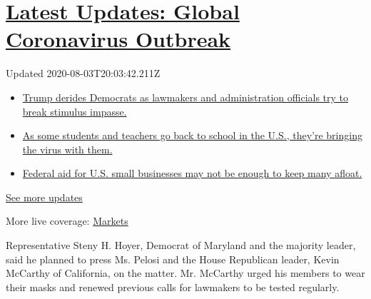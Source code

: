 \hypertarget{latest-updates-global-coronavirus-outbreak}{%
\section{\texorpdfstring{\href{https://www.nytimes.com/2020/08/03/world/coronavirus-covid-19.html?action=click\&pgtype=Article\&state=default\&region=MAIN_CONTENT_1\&context=storylines_live_updates}{Latest
Updates: Global Coronavirus
Outbreak}}{Latest Updates: Global Coronavirus Outbreak}}\label{latest-updates-global-coronavirus-outbreak}}

Updated 2020-08-03T20:03:42.211Z

\begin{itemize}
\tightlist
\item
  \href{https://www.nytimes.com/2020/08/03/world/coronavirus-covid-19.html?action=click\&pgtype=Article\&state=default\&region=MAIN_CONTENT_1\&context=storylines_live_updates\#link-15e7f995}{Trump
  derides Democrats as lawmakers and administration officials try to
  break stimulus impasse.}
\item
  \href{https://www.nytimes.com/2020/08/03/world/coronavirus-covid-19.html?action=click\&pgtype=Article\&state=default\&region=MAIN_CONTENT_1\&context=storylines_live_updates\#link-4c85ed64}{As
  some students and teachers go back to school in the U.S., they're
  bringing the virus with them.}
\item
  \href{https://www.nytimes.com/2020/08/03/world/coronavirus-covid-19.html?action=click\&pgtype=Article\&state=default\&region=MAIN_CONTENT_1\&context=storylines_live_updates\#link-6bff0af2}{Federal
  aid for U.S. small businesses may not be enough to keep many afloat.}
\end{itemize}

\href{https://www.nytimes.com/2020/08/03/world/coronavirus-covid-19.html?action=click\&pgtype=Article\&state=default\&region=MAIN_CONTENT_1\&context=storylines_live_updates}{See
more updates}

More live coverage:
\href{https://www.nytimes.com/live/2020/08/03/business/stock-market-today-coronavirus?action=click\&pgtype=Article\&state=default\&region=MAIN_CONTENT_1\&context=storylines_live_updates}{Markets}

Representative Steny H. Hoyer, Democrat of Maryland and the majority
leader, said he planned to press Ms. Pelosi and the House Republican
leader, Kevin McCarthy of California, on the matter. Mr. McCarthy urged
his members to wear their masks and renewed previous calls for lawmakers
to be tested regularly.

